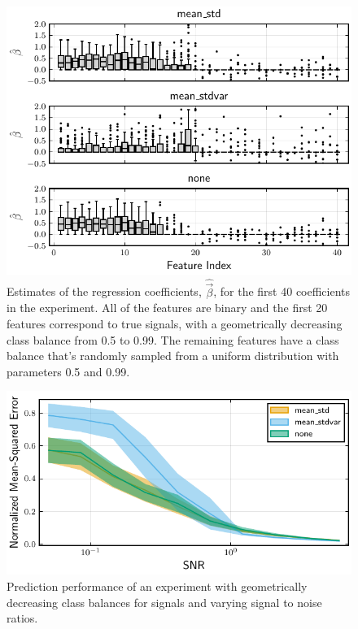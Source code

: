 \begin{figure}[htpb]
  \centering
  \includegraphics[]{plots/binary_decreasing.pdf}
  \caption{%
    Estimates of the regression coefficients, \(\hat{\vec{\beta}}\), for the first 40 coefficients in the experiment. All of the features are binary and the first 20 features correspond to true signals, with a geometrically decreasing class balance from 0.5 to 0.99. The remaining features have a class balance that's randomly sampled from a uniform distribution with parameters 0.5 and 0.99.}
  \label{fig:binary-decreasing}
\end{figure}

\begin{figure}[htpb]
  \centering
  \includegraphics[]{plots/binary_decreasing_snr.pdf}
  \caption{%
    Prediction performance of an experiment with geometrically decreasing class balances for signals and varying signal to noise ratios.
  }
  \label{fig:binary-decreasing-snr}
\end{figure}


